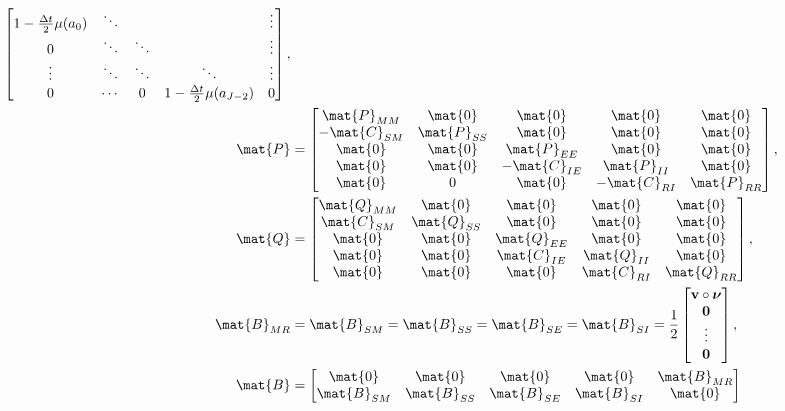 \documentclass{jpmarticle}
\renewcommand{\vec}[1]{\boldsymbol{\mathrm{#1}}}
\let\subequationsorig\subequations%
\let\endsubequationsorig\endsubequations%
\renewenvironment{subequations}{
  \subequationsorig
  \renewcommand{\theequation}{\theparentequation.\arabic{equation}}
}{
  \endsubequationsorig
}
\begin{document}
\begin{subequations}
\begin{align}
\begin{bmatrix}
      1 - \frac{\Delta t}{2} \mu(a_0) & \ddots &
      & & \vdots
      \\
      0 & \ddots & \ddots & & \vdots
      \\
      \vdots & \ddots & \ddots & \ddots & \vdots
      \\
      0 & \cdots & 0 &
      1 - \frac{\Delta t}{2} \mu(a_{J - 2}) & 0
    \end{bmatrix},
    \\
    \mat{P} &=
    \begin{bmatrix}
      \mat{P}_{MM} & \mat{0} & \mat{0} & \mat{0} & \mat{0}
      \\
      - \mat{C}_{SM} & \mat{P}_{SS} & \mat{0} & \mat{0} & \mat{0}
      \\
      \mat{0} & \mat{0} & \mat{P}_{EE} & \mat{0} & \mat{0}
      \\
      \mat{0} & \mat{0} & - \mat{C}_{IE} & \mat{P}_{II} & \mat{0}
      \\
      \mat{0} & 0 & \mat{0} & - \mat{C}_{RI} & \mat{P}_{RR}
    \end{bmatrix},
    \\
    \mat{Q} &=
    \begin{bmatrix}
      \mat{Q}_{MM} & \mat{0} & \mat{0} & \mat{0} & \mat{0}
      \\
      \mat{C}_{SM} & \mat{Q}_{SS} & \mat{0} & \mat{0} & \mat{0}
      \\
      \mat{0} & \mat{0} & \mat{Q}_{EE} & \mat{0} & \mat{0}
      \\
      \mat{0} & \mat{0} & \mat{C}_{IE} & \mat{Q}_{II} & \mat{0}
      \\
      \mat{0} & \mat{0} & \mat{0} & \mat{C}_{RI} & \mat{Q}_{RR}
    \end{bmatrix},
    \\
    \mat{B}_{MR} &= \mat{B}_{SM} = \mat{B}_{SS} = \mat{B}_{SE} = \mat{B}_{SI}
    =
    \frac{1}{2}
    \begin{bmatrix}
      \vec{v} \circ \vec{\nu} \\ \vec{0} \\ \vdots \\ \vec{0}
    \end{bmatrix},
    \\
    \mat{B} &=
    \begin{bmatrix}
      \mat{0} & \mat{0} & \mat{0} & \mat{0} & \mat{B}_{MR}
      \\
      \mat{B}_{SM} & \mat{B}_{SS} & \mat{B}_{SE} & \mat{B}_{SI} & \mat{0}
      \\

\end{bmatrix}
\end{align}
\end{subequations}
\end{document}
